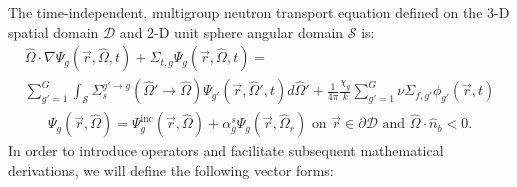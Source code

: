 \documentclass[letterpaper]{mc2025}
\begin{document}
The time-independent, multigroup neutron transport equation defined on the 3-D spatial domain
$\mathcal{D}$ and 2-D unit sphere angular domain $\mathcal{S}$ is:
%
\begin{multline}
  \hat{\Omega}\cdot\nabla\Psi_g(\vec{r},\hat{\Omega},t) + \Sigma_{t,g}
  \Psi_g(\vec{r},\hat{\Omega},t) = \\
  \sum^G_{g'=1}\int_\mathcal{S} \Sigma_s^{g'\rightarrow g}(\hat{\Omega}'\rightarrow\hat{\Omega})
  \Psi_{g'}(\vec{r},\hat{\Omega}',t)d\hat{\Omega}'
  + \frac{1}{4\pi}\frac{\chi_{g}}{k}\sum^G_{g'=1} \nu\Sigma_{f,g'} \phi_{g'}(\vec{r},t)
  \label{eq:mg-nte}
\end{multline}
%
\begin{gather}
  \Psi_g(\vec{r},\hat{\Omega}) = \Psi^\text{inc}_g(\vec{r},\hat{\Omega}) +
  \alpha^s_g\Psi_g(\vec{r},\hat{\Omega}_r)
  \mbox{ on } \vec{r} \in \partial\mathcal{D} \mbox{ and } \hat{\Omega}\cdot\hat{n}_b < 0.
  \label{eq:mg-nte-bc}
\end{gather}
%
In order to introduce operators and facilitate subsequent mathematical derivations, we will define
the following vector forms:
%
\end{document}
